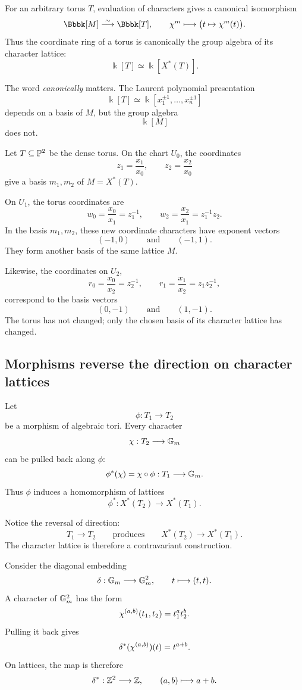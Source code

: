 For an arbitrary torus \(T\), evaluation of characters gives a
canonical isomorphism
\[
\Bbbk[M]
\overset{\sim}{\longrightarrow}
\Bbbk[T],
\qquad
\character{m}\longmapsto
\bigl(t\mapsto\character{m}(t)\bigr).
\]
Thus the coordinate ring of a torus is canonically the group algebra
of its character lattice:
\[
\boxed{\Bbbk[T]\simeq\Bbbk[X^*(T)].}
\]

The word \emph{canonically} matters. The Laurent polynomial
presentation
\[
\Bbbk[T]
\simeq
\Bbbk[x_1^{\pm1},\ldots,x_n^{\pm1}]
\]
depends on a basis of \(M\), but the group algebra
\[
\Bbbk[M]
\]
does not.

\begin{example}
Let \(T\subseteq\mathbb{P}^2\) be the dense torus. On the chart \(U_0\), the
coordinates
\[
z_1=\frac{x_1}{x_0},
\qquad
z_2=\frac{x_2}{x_0}
\]
give a basis \(m_1,m_2\) of \(M=X^*(T)\).

On \(U_1\), the torus coordinates are
\[
w_0=\frac{x_0}{x_1}=z_1^{-1},
\qquad
w_2=\frac{x_2}{x_1}=z_1^{-1}z_2.
\]
In the basis \(m_1,m_2\), these new coordinate characters have exponent
vectors
\[
(-1,0)
\qquad\text{and}\qquad
(-1,1).
\]
They form another basis of the same lattice \(M\).

Likewise, the coordinates on \(U_2\),
\[
r_0=\frac{x_0}{x_2}=z_2^{-1},
\qquad
r_1=\frac{x_1}{x_2}=z_1z_2^{-1},
\]
correspond to the basis vectors
\[
(0,-1)
\qquad\text{and}\qquad
(1,-1).
\]
The torus has not changed; only the chosen basis of its character
lattice has changed.
\end{example}

\subsection{Morphisms reverse the direction on character lattices}

Let
\[
\phi:T_1\longrightarrow T_2
\]
be a morphism of algebraic tori. Every character
\[
\chi:T_2\longrightarrow\mathbb{G}_{m}
\]
can be pulled back along \(\phi\):
\[
\phi^*(\chi)
=
\chi\circ\phi:T_1\longrightarrow\mathbb{G}_{m}.
\]
Thus \(\phi\) induces a homomorphism of lattices
\[
\phi^*:X^*(T_2)\longrightarrow X^*(T_1).
\]

Notice the reversal of direction:
\[
T_1\longrightarrow T_2
\qquad\text{produces}\qquad
X^*(T_2)\longrightarrow X^*(T_1).
\]
The character lattice is therefore a contravariant construction.

\begin{example}
Consider the diagonal embedding
\[
\delta:\mathbb{G}_{m}\longrightarrow\mathbb{G}_{m}^2,
\qquad
t\longmapsto(t,t).
\]
A character of \(\mathbb{G}_{m}^2\) has the form
\[
\chi^{(a,b)}(t_1,t_2)=t_1^at_2^b.
\]
Pulling it back gives
\[
\delta^*(\chi^{(a,b)})(t)
=
t^{a+b}.
\]
On lattices, the map is therefore
\[
\delta^*:\mathbb{Z}^2\longrightarrow\mathbb{Z},
\qquad
(a,b)\longmapsto a+b.
\]
\end{example}

